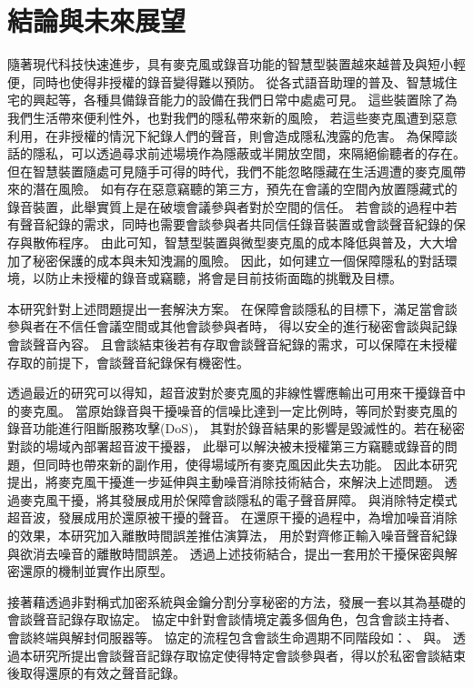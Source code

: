\chapter{結論與未來展望}\label{chapter:conclusion}

    隨著現代科技快速進步，具有麥克風或錄音功能的智慧型裝置越來越普及與短小輕便，同時也使得非授權的錄音變得難以預防。
從各式語音助理的普及、智慧城住宅的興起等，各種具備錄音能力的設備在我們日常中處處可見。
這些裝置除了為我們生活帶來便利性外，也對我們的隱私帶來新的風險，
若這些麥克風遭到惡意利用，在非授權的情況下紀錄人們的聲音，則會造成隱私洩露的危害。
為保障談話的隱私，可以透過尋求前述場境作為隱蔽或半開放空間，來隔絕偷聽者的存在。
但在智慧裝置隨處可見隨手可得的時代，我們不能忽略隱藏在生活週遭的麥克風帶來的潛在風險。
如有存在惡意竊聽的第三方，預先在會議的空間內放置隱藏式的錄音裝置，此舉實質上是在破壞會議參與者對於空間的信任。
若會談的過程中若有聲音紀錄的需求，同時也需要會談參與者共同信任錄音裝置或會談聲音紀錄的保存與散佈程序。
由此可知，智慧型裝置與微型麥克風的成本降低與普及，大大增加了秘密保護的成本與未知洩漏的風險。
因此，如何建立一個保障隱私的對話環境，以防止未授權的錄音或竊聽，將會是目前技術面臨的挑戰及目標。

    本研究針對上述問題提出一套解決方案。
在保障會談隱私的目標下，滿足當會談參與者在不信任會議空間或其他會談參與者時，
得以安全的進行秘密會談與記錄會談聲音內容。
且會談結束後若有存取會談聲音紀錄的需求，可以保障在未授權存取的前提下，會談聲音紀錄保有機密性。

    透過最近的研究可以得知，超音波對於麥克風的非線性響應輸出可用來干擾錄音中的麥克風。
當原始錄音與干擾噪音的信噪比達到一定比例時，等同於對麥克風的錄音功能進行阻斷服務攻擊(DoS)，
其對於錄音結果的影響是毀滅性的。若在秘密對談的場域內部署超音波干擾器，
此舉可以解決被未授權第三方竊聽或錄音的問題，但同時也帶來新的副作用，使得場域所有麥克風因此失去功能。
因此本研究提出，將麥克風干擾進一步延伸與主動噪音消除技術結合，來解決上述問題。
透過麥克風干擾，將其發展成用於保障會談隱私的電子聲音屏障。
與消除特定模式超音波，發展成用於還原被干擾的聲音。
在還原干擾的過程中，為增加噪音消除的效果，本研究加入離散時間誤差推估演算法，
用於對齊修正輸入噪音聲音紀錄與欲消去噪音的離散時間誤差。
透過上述技術結合，提出一套用於干擾保密與解密還原的機制並實作出原型。

    接著藉透過非對稱式加密系統與金鑰分割分享秘密的方法，發展一套以其為基礎的會談聲音記錄存取協定。
協定中針對會談情境定義多個角色，包含會談主持者、會談終端與解封伺服器等。
協定的流程包含會談生命週期不同階段如：、
與。
透過本研究所提出會談聲音記錄存取協定使得特定會談參與者，得以於私密會談結束後取得還原的有效之聲音記錄。

